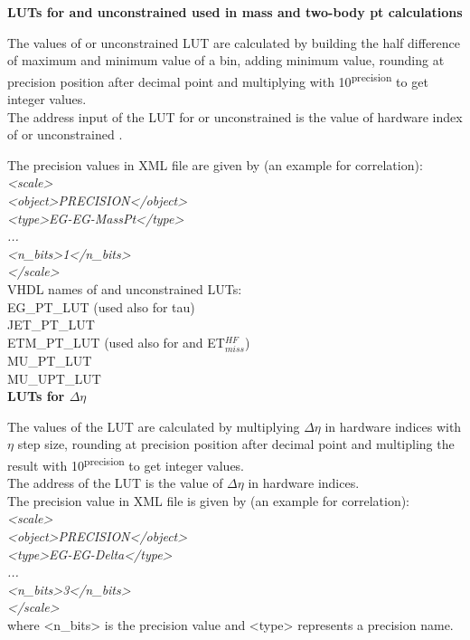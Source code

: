 \textbf{LUTs for \pt and unconstrained \pt used in mass and two-body pt calculations}
\label{sec:gtl:calc_luts_pt}

The values of \pt or unconstrained \pt LUT are calculated by building the half difference of maximum and minimum value of a bin, adding minimum value, rounding at precision position after decimal point and multiplying with 10\textsuperscript{\tiny{precision}} to get integer values.\\
The address input of the LUT for \pt or unconstrained \pt is the value of hardware index of \pt or unconstrained \pt.

The precision values in XML file are given by (an example for \eg \eg correlation):\\
\textit{<scale>\\
    <object>PRECISION</object>\\
    <type>EG-EG-MassPt</type>\\
    ...\\
    <n\_bits>1</n\_bits>\\
</scale>}\\

VHDL names of \pt and unconstrained \pt LUTs:\\
EG\_PT\_LUT (used also for tau)\\
JET\_PT\_LUT\\
ETM\_PT\_LUT (used also for \htm and ET$_{miss}^{HF}$)\\
MU\_PT\_LUT\\
MU\_UPT\_LUT\\

\textbf{LUTs for $\Delta\eta$}
\label{sec:gtl:calc_luts_delta_eta}

The values of the LUT are calculated by multiplying $\Delta\eta$ in hardware indices with $\eta$ step size, rounding at precision position after decimal point and multipling the result with 10\textsuperscript{\tiny{precision}} to get integer values.\\
The address of the LUT is the value of $\Delta\eta$ in hardware indices.\\

The precision value in XML file is given by (an example for \eg \eg correlation):\\
\textit{<scale>\\
    <object>PRECISION</object>\\
    <type>EG-EG-Delta</type>\\
    ...\\
    <n\_bits>3</n\_bits>\\
</scale>}\\
where <n\_bits> is the precision value and <type> represents a precision name.\\

